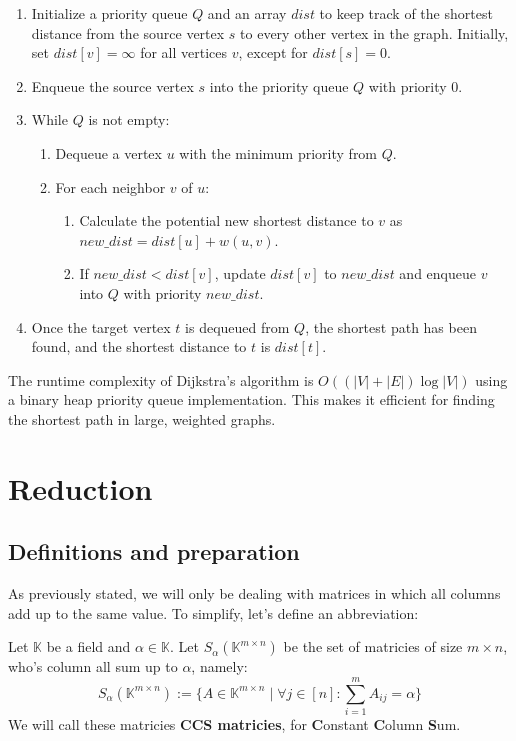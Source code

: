 \begin{enumerate}
    \item Initialize a priority queue $Q$ and an array $dist$ to keep track of the shortest distance from the source vertex $s$ to every other vertex in the graph. Initially, set $dist[v] = \infty$ for all vertices $v$, except for $dist[s] = 0$.
    \item Enqueue the source vertex $s$ into the priority queue $Q$ with priority $0$.
    \item While $Q$ is not empty:
    \begin{enumerate}
        \item Dequeue a vertex $u$ with the minimum priority from $Q$.
        \item For each neighbor $v$ of $u$:
        \begin{enumerate}
            \item Calculate the potential new shortest distance to $v$ as $new\_dist = dist[u] + w(u, v)$.
            \item If $new\_dist < dist[v]$, update $dist[v]$ to $new\_dist$ and enqueue $v$ into $Q$ with priority $new\_dist$.
        \end{enumerate}
    \end{enumerate}
    \item Once the target vertex $t$ is dequeued from $Q$, the shortest path has been found, and the shortest distance to $t$ is $dist[t]$.
\end{enumerate}

The runtime complexity of Dijkstra's algorithm is $O((|V| + |E|) \log |V|)$ using a binary heap priority queue implementation. This makes it efficient for finding the shortest path in large, weighted graphs.


\section{Reduction}
\subsection{Definitions and preparation}
As previously stated, we will only be dealing with matrices in which all columns add up to the same value. To simplify, let's define an abbreviation:

\begin{definition}
    \label{def:CCS}
    Let $\mathbb{K}$ be a field and $\alpha \in \mathbb{K}$. Let $S_{\alpha}(\mathbb{K}^{m \times n})$ be the set of matricies of size $m \times n$, who's column all sum up to $\alpha$, namely:
    $$S_{\alpha}(\mathbb{K}^{m \times n}) := \{A \in \mathbb{K}^{m \times n}\mid \forall j \in [n]\colon \sum_{i=1}^{m} A_{ij} = \alpha\}$$
    We will call these matricies \textbf{CCS matricies}, for \textbf{C}onstant \textbf{C}olumn \textbf{S}um.
\end{definition}


